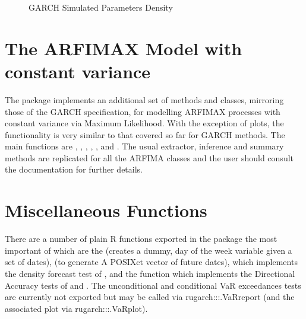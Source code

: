 \begin{landscape}
\begin{figure}[!ht]
\caption[GARCH Simulated Parameters Density]{GARCH Simulated Parameters Density}\label{fig:dist3}
\end{figure}
\end{landscape}

\section{The ARFIMAX Model with constant variance}\label{section:arfima}
The \verb@rugarch@ package implements an additional set of methods and classes,
mirroring those of the GARCH specification, for modelling ARFIMAX processes
with constant variance via Maximum Likelihood. With the exception of plots, the
functionality is very similar to that covered so far for GARCH methods. The main
functions are \verb@arfimaspec@, \verb@arfimafit@, \verb@arfimaforecast@,
\verb@arfimasim@, \verb@arfimapath@, \verb@arfimadistirbution@ and \verb@arfimaroll@.
The usual extractor, inference and summary methods are replicated for all the
ARFIMA classes and the user should consult the documentation for further details.

\section{Miscellaneous Functions}\label{section:misc}
There are a number of plain R functions exported in the package the most important
of which are the \verb@WeekDayDummy@ (creates a dummy, day of the week variable
given a set of dates), \verb@ForwardDates@ (to generate A POSIXct vector of future
dates), \verb@BerkowitzLR@ which implements the density forecast test of
\citet{Berkowitz}, and the \verb@DACTest@ function which implements the Directional
Accuracy tests of \citet{Anatolyev} and \citet{Pesaran}. The unconditional and
conditional VaR exceedances tests are currently not exported but may be called
via rugarch:::.VaRreport (and the associated plot via rugarch:::.VaRplot).

